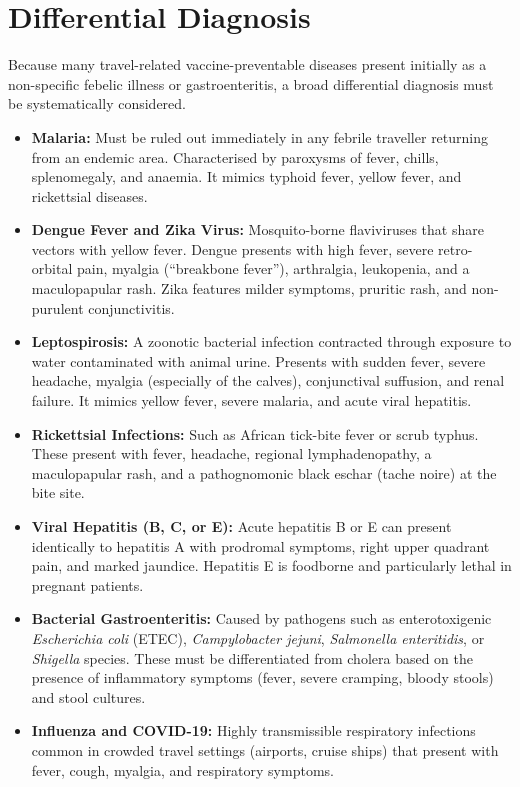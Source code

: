 \section*{Differential Diagnosis}
Because many travel-related vaccine-preventable diseases present initially as a non-specific febelic illness or gastroenteritis, a broad differential diagnosis must be systematically considered.
\begin{itemize}
    \item \textbf{Malaria:} Must be ruled out immediately in any febrile traveller returning from an endemic area. Characterised by paroxysms of fever, chills, splenomegaly, and anaemia. It mimics typhoid fever, yellow fever, and rickettsial diseases.
    \item \textbf{Dengue Fever and Zika Virus:} Mosquito-borne flaviviruses that share vectors with yellow fever. Dengue presents with high fever, severe retro-orbital pain, myalgia (``breakbone fever''), arthralgia, leukopenia, and a maculopapular rash. Zika features milder symptoms, pruritic rash, and non-purulent conjunctivitis.
    \item \textbf{Leptospirosis:} A zoonotic bacterial infection contracted through exposure to water contaminated with animal urine. Presents with sudden fever, severe headache, myalgia (especially of the calves), conjunctival suffusion, and renal failure. It mimics yellow fever, severe malaria, and acute viral hepatitis.
    \item \textbf{Rickettsial Infections:} Such as African tick-bite fever or scrub typhus. These present with fever, headache, regional lymphadenopathy, a maculopapular rash, and a pathognomonic black eschar (tache noire) at the bite site.
    \item \textbf{Viral Hepatitis (B, C, or E):} Acute hepatitis B or E can present identically to hepatitis A with prodromal symptoms, right upper quadrant pain, and marked jaundice. Hepatitis E is foodborne and particularly lethal in pregnant patients.
    \item \textbf{Bacterial Gastroenteritis:} Caused by pathogens such as enterotoxigenic \textit{Escherichia coli} (ETEC), \textit{Campylobacter jejuni}, \textit{Salmonella enteritidis}, or \textit{Shigella} species. These must be differentiated from cholera based on the presence of inflammatory symptoms (fever, severe cramping, bloody stools) and stool cultures.
    \item \textbf{Influenza and COVID-19:} Highly transmissible respiratory infections common in crowded travel settings (airports, cruise ships) that present with fever, cough, myalgia, and respiratory symptoms.
\end{itemize}


